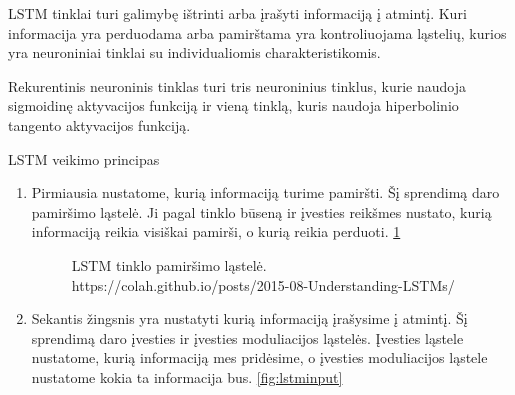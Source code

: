 LSTM tinklai turi galimybę ištrinti arba įrašyti informaciją į atmintį. Kuri informacija yra perduodama arba pamirštama yra kontroliuojama ląstelių, kurios yra neuroniniai tinklai su individualiomis charakteristikomis.\cite{Christopher2015}

Rekurentinis neuroninis tinklas turi tris neuroninius tinklus, kurie naudoja sigmoidinę aktyvacijos funkciją ir vieną tinklą, kuris naudoja hiperbolinio tangento aktyvacijos funkciją.

LSTM veikimo principas \cite{Christopher2015}
\begin{enumerate}
  \item Pirmiausia nustatome, kurią informaciją turime pamiršti. Šį sprendimą daro pamiršimo ląstelė. Ji pagal tinklo būseną ir įvesties reikšmes nustato, kurią informaciją reikia visiškai pamirši, o kurią reikia perduoti. \ref{fig:lstmforget}
  \begin{figure}[h!]
    \centering
  \caption{LSTM tinklo pamiršimo ląstelė.\\https://colah.github.io/posts/2015-08-Understanding-LSTMs/}
  \label{fig:lstmforget}
  \end{figure}
  \item Sekantis žingsnis yra nustatyti kurią informaciją įrašysime į atmintį. Šį sprendimą daro įvesties ir įvesties moduliacijos ląstelės. Įvesties ląstele nustatome, kurią informaciją mes pridėsime, o įvesties moduliacijos ląstele nustatome kokia ta informacija bus. \ref{fig:lstminput}
\begin{figure}[h!]
  \centering
{}

\end{figure}
\end{enumerate}
